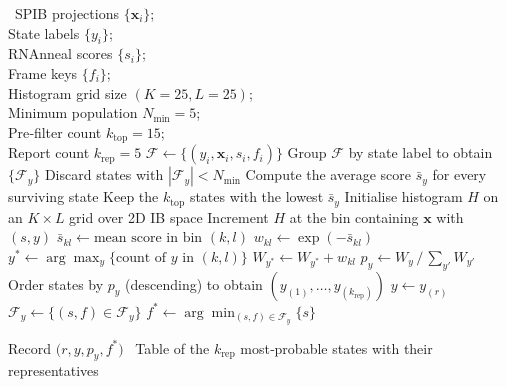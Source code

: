 \documentclass[%
aip,
 amsmath,amssymb,
reprint,%
onecolumn,
]{revtex4-1}
\begin{document}
{\begin{algorithm}[H]
  \caption{Boltzmann‑weighted State Ranking and Representative Selection}
  \label{alg:state-ranking}
  \begin{algorithmic}[1]
    \REQUIRE\ SPIB projections $\{\mathbf{x}_{i}\}$;\\
    State labels $\{y_{i}\}$;\\
    RNAnneal scores $\{s_{i}\}$;\\ Frame keys $\{f_{i}\}$;\\ Histogram grid size $(K=25,L=25)$;\\ Minimum population $N_{\min}=5$;\\ Pre‑filter count $k_{\mathrm{top}}=15$;\\ Report count $k_{\mathrm{rep}}=5$
    \STATE $\mathcal{F}\!\leftarrow\!\{(y_{i},\mathbf{x}_{i},s_{i},f_{i})\}$ 
    \STATE Group $\mathcal{F}$ by state label to obtain $\{\mathcal{F}_y\}$
    \STATE Discard states with $|\mathcal{F}_y|<N_{\min}$
    \STATE Compute the average score $\bar{s}_y $ for every surviving state
    \STATE Keep the $k_{\mathrm{top}}$ states with the lowest $\bar{s}_y$
    \STATE Initialise histogram $H$ on an $K\times L$ grid over 2D IB space
      \STATE Increment $H$ at the bin containing $\mathbf{x}$ with $(s,y)$
    \ENDFOR
      \STATE $\bar{s}_{kl}\!\leftarrow\!\text{mean score in bin }(k,l)$
      \STATE $w_{kl}\!\leftarrow\!\exp(-\bar{s}_{kl})$ 
      \STATE $y^\ast\!\leftarrow\!\arg\max_y\{\text{count of }y\text{ in }(k,l)\}$ 
      \STATE $W_{y^\ast}\!\leftarrow\!W_{y^\ast}+w_{kl}$ 
    \ENDFOR
    \STATE $p_y\!\leftarrow\!W_y\,/\,\sum_{y'}W_{y'}$ 
    \STATE Order states by $p_y$ (descending) to obtain $(y_{(1)},\dots,y_{(k_{\mathrm{rep}})})$
      \STATE $y\!\leftarrow\!y_{(r)}$
      \STATE $\mathcal{F}_y\!\leftarrow\!\{(s,f)\in\mathcal{F}_y\}$
      \STATE $f^\ast\!\leftarrow\!\arg\min_{(s,f)\in\mathcal{F}_y}\{s\}$ 
      
      \STATE Record $\bigl(r,y,p_y,f^\ast\bigr)$
    \ENDFOR
    \RETURN\ Table of the $k_{\mathrm{rep}}$ most‑probable states with their representatives
  \end{algorithmic}
\end{algorithm}

}
\end{document}
